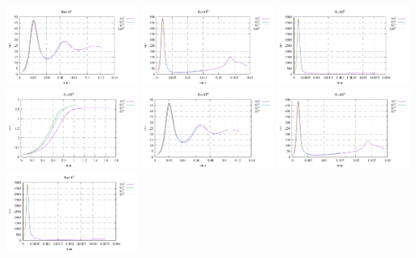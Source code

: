 \begin{center}
\includegraphics[width=4.297cm]{python_codes/fieldstone_155/results/avrg_u_Ra1e4}
\includegraphics[width=4.297cm]{python_codes/fieldstone_155/results/avrg_u_Ra1e5}
\includegraphics[width=4.297cm]{python_codes/fieldstone_155/results/avrg_u_Ra1e6}\\
\includegraphics[width=4.297cm]{python_codes/fieldstone_155/results/avrg_v_Ra1e3}
\includegraphics[width=4.297cm]{python_codes/fieldstone_155/results/avrg_v_Ra1e4}
\includegraphics[width=4.297cm]{python_codes/fieldstone_155/results/avrg_v_Ra1e5}
\includegraphics[width=4.297cm]{python_codes/fieldstone_155/results/avrg_v_Ra1e6}\\

\end{center}
